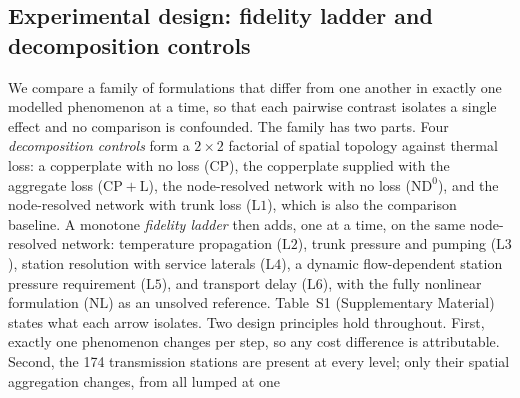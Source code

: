 \documentclass[a4paper,fleqn]{cas-sc}
\newcommand{\CP}{\ensuremath{\mathrm{CP}}}      %
\newcommand{\CPL}{\ensuremath{\mathrm{CP{+}L}}} %
\newcommand{\NDz}{\ensuremath{\mathrm{ND^{0}}}} %
\newcommand{\Lone}{\ensuremath{\mathrm{L1}}}    %
\newcommand{\Ltwo}{\ensuremath{\mathrm{L2}}}    %
\newcommand{\Lthree}{\ensuremath{\mathrm{L3}}}  %
\newcommand{\Lfour}{\ensuremath{\mathrm{L4}}}   %
\newcommand{\Lfive}{\ensuremath{\mathrm{L5}}}   %
\newcommand{\Lsix}{\ensuremath{\mathrm{L6}}}    %
\newcommand{\NLref}{\ensuremath{\mathrm{NL}}}   %
\begin{document}
\subsection{Experimental design: fidelity ladder and decomposition controls}
We compare a family of formulations that differ from one another in exactly one modelled
phenomenon at a time, so that each pairwise contrast isolates a single effect and no
comparison is confounded. The family has two parts. Four \emph{decomposition controls} form a
$2\times2$ factorial of spatial topology against thermal loss: a copperplate with no loss
($\CP$), the copperplate supplied with the aggregate loss ($\CPL$), the node-resolved network
with no loss ($\NDz$), and the node-resolved network with trunk loss ($\Lone$), which is also
the comparison baseline. A monotone \emph{fidelity ladder} then adds, one at a time, on the
same node-resolved network: temperature propagation ($\Ltwo$), trunk pressure and pumping
($\Lthree$), station resolution with service laterals ($\Lfour$), a dynamic flow-dependent
station pressure requirement ($\Lfive$), and transport delay ($\Lsix$), with the fully
nonlinear formulation ($\NLref$) as an unsolved reference. Table~S1 (Supplementary Material) states
what each arrow isolates. Two design principles hold throughout. First, exactly one phenomenon
changes per step, so any cost difference is attributable. Second, the 174 transmission stations
are present at every level; only their spatial aggregation changes, from all lumped at one
\end{document}

